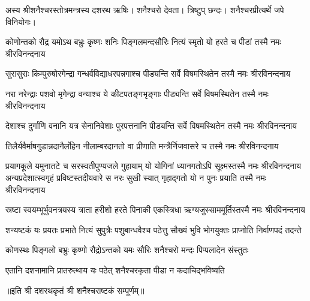 

अस्य श्रीशनैश्चरस्तोत्रमन्त्रस्य दशरथ ऋषिः। शनैश्चरो देवता। त्रिष्टुप् छन्दः। शनैश्चरप्रीत्यर्थे जपे विनियोगः।


\twolineshloka
{कोणोन्तको रौद्र यमोऽथ बभ्रुः कृष्णः शनिः पिङ्गलमन्दसौरिः}
{नित्यं स्मृतो यो हरते च पीडां तस्मै नमः श्रीरविनन्दनाय}

\twolineshloka
{सुरासुराः किम्पुरुषोरगेन्द्रा गन्धर्वविद्याधरपन्नगाश्च}
{पीड्यन्ति सर्वे विषमस्थितेन तस्मै नमः श्रीरविनन्दनाय}

\twolineshloka
{नरा नरेन्द्राः पशवो मृगेन्द्रा वन्याश्च ये कीटपतङ्गभृङ्गाः}
{पीड्यन्ति सर्वे विषमस्थितेन तस्मै नमः श्रीरविनन्दनाय}

\twolineshloka
{देशाश्च दुर्गाणि वनानि यत्र सेनानिवेशाः पुरपत्तनानि}
{पीड्यन्ति सर्वे विषमस्थितेन तस्मै नमः श्रीरविनन्दनाय}

\twolineshloka
{तिलैर्यवैर्माषगुडान्नदानैर्लोहेन नीलाम्बरदानतो वा}
{प्रीणाति मन्त्रैर्निजवासरे च तस्मै नमः श्रीरविनन्दनाय}

\twolineshloka
{प्रयागकूले यमुनातटे च सरस्वतीपुण्यजले गुहायाम्}
{यो योगिनां ध्यानगतोऽपि सूक्ष्मस्तस्मै नमः श्रीरविनन्दनाय}
\twolineshloka
{अन्यप्रदेशात्स्वगृहं प्रविष्टस्तदीयवारे स नरः सुखी स्यात्}
{गृहाद्गतो यो न पुनः प्रयाति तस्मै नमः श्रीरविनन्दनाय}

\twolineshloka
{स्रष्टा स्वयम्भूर्भुवनत्रयस्य त्राता हरीशो हरते पिनाकी}
{एकस्त्रिधा ऋग्यजुस्साममूर्तिस्तस्मै नमः श्रीरविनन्दनाय}

\twolineshloka
{शन्यष्टकं यः प्रयतः प्रभाते नित्यं सुपुत्रैः पशुबान्धवैश्च}
{पठेत्तु सौख्यं भुवि भोगयुक्तः प्राप्नोति निर्वाणपदं तदन्ते}

\twolineshloka
{कोणस्थः पिङ्गलो बभ्रुः कृष्णो रौद्रोऽन्तको यमः}
{सौरिः शनैश्चरो मन्दः पिप्पलादेन संस्तुतः}

\twolineshloka
{एतानि दशनामानि प्रातरुत्थाय यः पठेत्}
{शनैश्चरकृता पीडा न कदाचिद्भविष्यति}

॥इति श्री दशरथकृतं श्री शनैश्चराष्टकं सम्पूर्णम्॥

